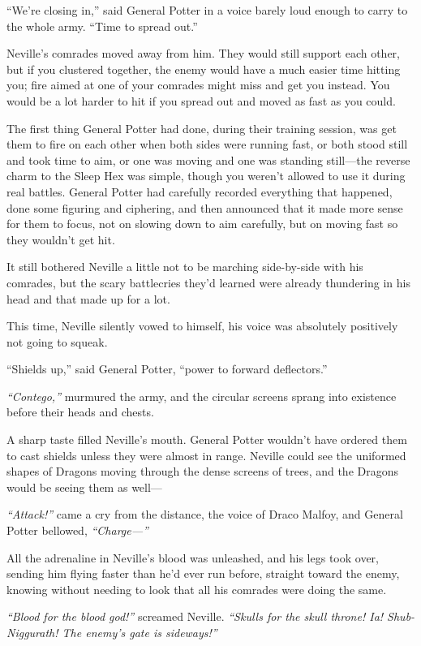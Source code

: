 ``We're closing in,'' said General Potter in a voice barely loud enough
to carry to the whole army. ``Time to spread out.''

Neville's comrades moved away from him. They would still support each
other, but if you clustered together, the enemy would have a much easier
time hitting you; fire aimed at one of your comrades might miss and get
you instead. You would be a lot harder to hit if you spread out and
moved as fast as you could.

The first thing General Potter had done, during their training session,
was get them to fire on each other when both sides were running fast, or
both stood still and took time to aim, or one was moving and one was
standing still---the reverse charm to the Sleep Hex was simple, though
you weren't allowed to use it during real battles. General Potter had
carefully recorded everything that happened, done some figuring and
ciphering, and then announced that it made more sense for them to focus,
not on slowing down to aim carefully, but on moving fast so they
wouldn't get hit.

It still bothered Neville a little not to be marching side-by-side with
his comrades, but the scary battlecries they'd learned were already
thundering in his head and that made up for a lot.

This time, Neville silently vowed to himself, his voice was absolutely
positively not going to squeak.

``Shields up,'' said General Potter, ``power to forward deflectors.''

\emph{``Contego,''} murmured the army, and the circular screens sprang
into existence before their heads and chests.

A sharp taste filled Neville's mouth. General Potter wouldn't have
ordered them to cast shields unless they were almost in range. Neville
could see the uniformed shapes of Dragons moving through the dense
screens of trees, and the Dragons would be seeing them as well---

\emph{``Attack!''} came a cry from the distance, the voice of Draco
Malfoy, and General Potter bellowed, \emph{``Charge---''}

All the adrenaline in Neville's blood was unleashed, and his legs took
over, sending him flying faster than he'd ever run before, straight
toward the enemy, knowing without needing to look that all his comrades
were doing the same.

\emph{``Blood for the blood god!''} screamed Neville. \emph{``Skulls for
the skull throne! Ia! Shub-Niggurath! The enemy's gate is sideways!''}


